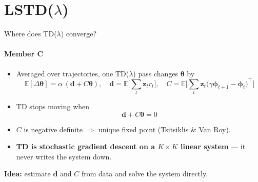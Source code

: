 \documentclass[aspectratio=169,11pt]{beamer}
\newcommand{\memberC}{Member C}
\newcommand{\speaker}[1]{\framesubtitle{#1}}
\newcommand{\hl}[1]{\textcolor{accent}{\textbf{#1}}}
\newcommand{\vphi}{\bm{\phi}}
\newcommand{\vz}{\mathbf{z}}
\newcommand{\vth}{\bm{\theta}}
\begin{document}
\section{LSTD($\lambda$)}

\begin{frame}{Where does TD($\lambda$) converge?}
  \speaker{\memberC}
  \begin{itemize}
    \item Averaged over trajectories, one TD($\lambda$) pass changes $\vth$ by
      \[ \mathbb{E}[\Delta\vth] = \alpha\,(\mathbf{d} + C\vth), \quad
        \mathbf{d} = \mathbb{E}\Big[\textstyle\sum_t \vz_t r_t\Big], \quad
        C = \mathbb{E}\Big[\textstyle\sum_t \vz_t\big(\gamma\vphi_{t+1} - \vphi_t\big)^\top\Big] \]
    \item TD stops moving when
      \[ \boxed{\mathbf{d} + C\vth = 0} \]
    \item $C$ is negative definite $\Rightarrow$ unique fixed point (Tsitsiklis \& Van Roy).
    \item \hl{TD is stochastic gradient descent on a $K\times K$ linear system} --- it never writes the system down.
  \end{itemize}
  \vspace{0.2em}
  \begin{keyidea}
    \textbf{Idea:} estimate $\mathbf{d}$ and $C$ from data and solve the system directly.
  \end{keyidea}
\end{frame}
\end{document}
